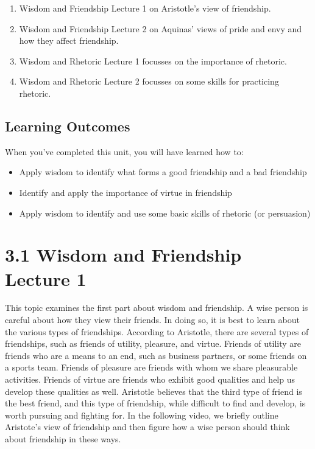 \documentclass[
]{book}
\providecommand{\tightlist}{%
  \setlength{\itemsep}{0pt}\setlength{\parskip}{0pt}}
\begin{document}
\begin{enumerate}
\def\labelenumi{\arabic{enumi}.}
\tightlist
\item
  Wisdom and Friendship Lecture 1 on Aristotle's view of friendship.
\item
  Wisdom and Friendship Lecture 2 on Aquinas' views of pride and envy and how they affect friendship.
\item
  Wisdom and Rhetoric Lecture 1 focusses on the importance of rhetoric.
\item
  Wisdom and Rhetoric Lecture 2 focusses on some skills for practicing rhetoric.
\end{enumerate}

\hypertarget{learning-outcomes-2}{%
\subsection*{Learning Outcomes}\label{learning-outcomes-2}}

When you've completed this unit, you will have learned how to:

\begin{itemize}
\tightlist
\item
  Apply wisdom to identify what forms a good friendship and a bad friendship
\item
  Identify and apply the importance of virtue in friendship
\item
  Apply wisdom to identify and use some basic skills of rhetoric (or persuasion)
\end{itemize}

\hypertarget{wisdom-and-friendship-lecture-1}{%
\section*{3.1 Wisdom and Friendship Lecture 1}\label{wisdom-and-friendship-lecture-1}}

This topic examines the first part about wisdom and friendship. A wise person is careful about how they view their friends. In doing so, it is best to learn about the various types of friendships. According to Aristotle, there are several types of friendships, such as friends of utility, pleasure, and virtue. Friends of utility are friends who are a means to an end, such as business partners, or some friends on a sports team. Friends of pleasure are friends with whom we share pleasurable activities. Friends of virtue are friends who exhibit good qualities and help us develop these qualities as well. Aristotle believes that the third type of friend is the best friend, and this type of friendship, while difficult to find and develop, is worth pursuing and fighting for. In the following video, we briefly outline Aristote's view of friendship and then figure how a wise person should think about friendship in these ways.
\end{document}
